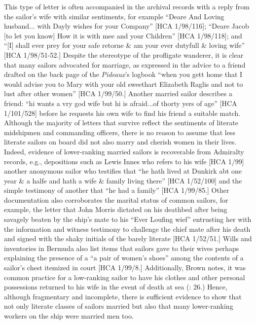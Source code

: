 This type of letter is often accompanied in the archival records with a reply from the sailor’s wife with similar sentiments, for example “Deare And Loving husband... with Dayly wishes for your Company” [HCA 1/98/116]; “Deare Jacob [to let you know] How it is with mee and your Children” [HCA 1/98/118]; and “[I] shall ever prey for your safe retorne \& am your ever dutyfull \& loving wife” [HCA 1/98/51-52.] Despite the stereotype of the profligate wanderer, it is clear that many sailors advocated for marriage, as expressed in the advice to a friend drafted on the back page of the \textit{Pideaux}’s logbook “when you gett home that I would advise you to Mary with your old sweethart Elizabeth Raglis and not to lust after other women” [HCA 1/99/50.] Another married sailor describes a friend: “hi wants a vry god wife but hi is afraid...of thorty yers of age” [HCA 1/101/528] before he requests his own wife to find his friend a suitable match. Although the majority of letters that survive reflect the sentiments of literate midshipmen and commanding officers, there is no reason to assume that less literate sailors on board did not also marry and cherish women in their lives. Indeed, evidence of lower-ranking married sailors is recoverable from Admiralty records, e.g., depositions such as Lewis Innes who refers to his wife [HCA 1/99] another anonymous sailor who testifies that “he hath lived at Dunkirk abt one year \& a halfe and hath a wife \& family living there” [HCA 1/52/100] and the simple testimony of another that “he had a family” [HCA 1/99/85.] Other documentation also corroborates the marital status of common sailors, for example, the letter that John Morris dictated on his deathbed after being savagely beaten by the ship’s mate to his “Ever Loufing wief” entrusting her with the information and witness testimony to challenge the chief mate after his death and signed with the shaky initials of the barely literate [HCA 1/52/51.] Wills and inventories in Bermuda also list items that sailors gave to their wives \citep[214]{Jarvis2010} perhaps explaining the presence of a “a pair of women’s shoes” among the contents of a sailor’s chest itemized in court [HCA 1/99/8.] Additionally, Brown notes, it was common practice for a low-ranking sailor to have his clothes and other personal possessions returned to his wife in the event of death at sea (\citealt{Brown2011}: 26.) Hence, although fragmentary and incomplete, there is sufficient evidence to show that not only literate classes of sailors married but also that many lower-ranking workers on the ship were married men too. 

